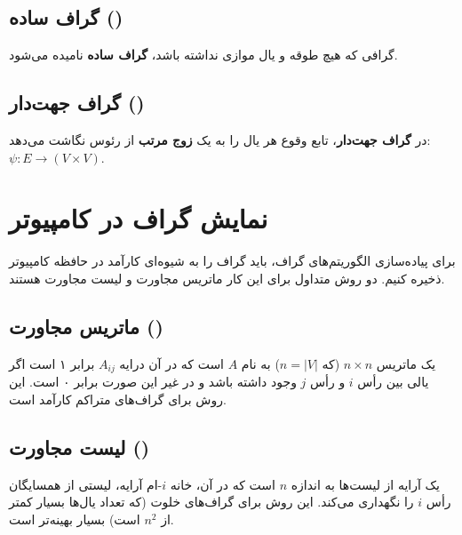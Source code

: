 \subsection{گراف ساده ()}
گرافی که هیچ طوقه و یال موازی نداشته باشد، \textbf{گراف ساده} نامیده می‌شود.

\subsection{گراف جهت‌دار ()}
در \textbf{گراف جهت‌دار}، تابع وقوع هر یال را به یک \textbf{زوج مرتب} از رئوس نگاشت می‌دهد: $\psi: E \to (V \times V)$.

\section{نمایش گراف در کامپیوتر}
\label{sec:graph_representation}
برای پیاده‌سازی الگوریتم‌های گراف، باید گراف را به شیوه‌ای کارآمد در حافظه کامپیوتر ذخیره کنیم. دو روش متداول برای این کار ماتریس مجاورت و لیست مجاورت هستند.

\subsection{ماتریس مجاورت ()}
یک ماتریس $n \times n$ (که $n = |V|$) به نام $A$ است که در آن درایه $A_{ij}$ برابر ۱ است اگر یالی بین رأس $i$ و رأس $j$ وجود داشته باشد و در غیر این صورت برابر ۰ است. این روش برای گراف‌های متراکم کارآمد است.

\subsection{لیست مجاورت ()}
\label{def:adj_list}
یک آرایه از لیست‌ها به اندازه $n$ است که در آن، خانه $i$-ام آرایه، لیستی از همسایگان رأس $i$ را نگهداری می‌کند. این روش برای گراف‌های خلوت (که تعداد یال‌ها بسیار کمتر از $n^2$ است) بسیار بهینه‌تر است.

